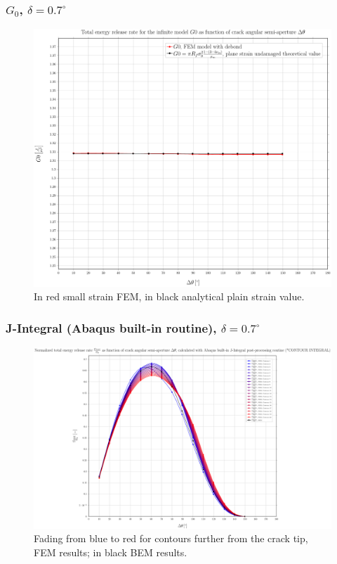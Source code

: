 \documentclass[first,firstsupp,lastsupp,handout,last,hyperref,table]{ETHclass}
\begin{document}
\begin{frame}
\frametitle{\small $G_{0}$, $\delta=0.7^{\circ}$}
\vspace{-0.5cm}
\centering
\captionsetup[figure]{font=scriptsize,labelfont=scriptsize}
\begin{figure}[!h]
\centering
\includegraphics[height=0.7\textheight]{2017-07-10_AbqRunSummary_SmallStrainD07_G0_Summary.pdf}
  \caption{\scriptsize In red small strain FEM, in black analytical plain strain value.}
  \label{fig:res1}
\end{figure}
\end{frame}

\begin{frame}
\frametitle{\small J-Integral (Abaqus built-in routine), $\delta=0.7^{\circ}$}
\vspace{-0.5cm}
\centering
\captionsetup[figure]{font=scriptsize,labelfont=scriptsize}
\begin{figure}[!h]
\centering
\includegraphics[height=0.7\textheight]{2017-07-10_AbqRunSummary_SmallStrainD07_J-INT_Summary.pdf}
  \caption{\scriptsize Fading from blue to red for contours further from the crack tip, FEM results; in black BEM results.}
  \label{fig:res1}
\end{figure}
\end{frame}
\end{document}
